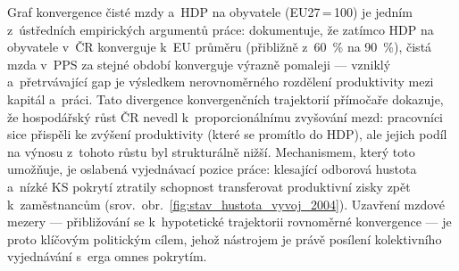 Graf konvergence čisté mzdy a~\ac{HDP} na obyvatele (\ac{EU}27\,=\,100) je jedním z~ústředních empirických argumentů práce: dokumentuje, že zatímco \ac{HDP} na obyvatele v~ČR konverguje k~\ac{EU} průměru (přibližně z~\SI{60}{\percent} na \SI{90}{\percent}), čistá mzda v~\ac{PPS} za stejné období konverguje výrazně pomaleji --- vzniklý a~přetrvávající gap je výsledkem nerovnoměrného rozdělení produktivity mezi kapitál a~práci.
Tato divergence konvergenčních trajektorií přímočaře dokazuje, že hospodářský růst ČR nevedl k~proporcionálnímu zvyšování mezd: pracovníci sice přispěli ke zvýšení produktivity (které se promítlo do \ac{HDP}), ale jejich podíl na výnosu z~tohoto růstu byl strukturálně nižší.
Mechanismem, který toto umožňuje, je oslabená vyjednávací pozice práce: klesající odborová hustota a~nízké \ac{KS} pokrytí ztratily schopnost transferovat produktivní zisky zpět k~zaměstnancům (srov.~obr.~\ref{fig:stav_hustota_vyvoj_2004}).
Uzavření mzdové mezery --- přibližování se k~hypotetické trajektorii rovnoměrné konvergence --- je proto klíčovým politickým cílem, jehož nástrojem je právě posílení kolektivního vyjednávání s~erga omnes pokrytím.


